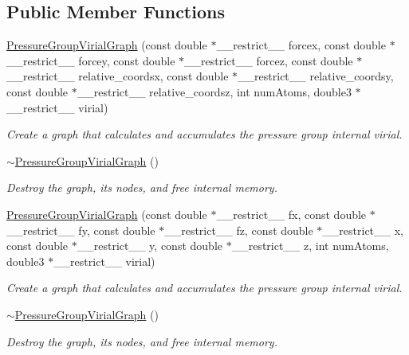 \subsection*{Public Member Functions}
\begin{DoxyCompactItemize}
\item 
\hyperlink{classPressureGroupVirialGraph_ae7ff1b34d814a6c977a50430167f4304}{Pressure\+Group\+Virial\+Graph} (const double $\ast$\+\_\+\+\_\+restrict\+\_\+\+\_\+ forcex, const double $\ast$\+\_\+\+\_\+restrict\+\_\+\+\_\+ forcey, const double $\ast$\+\_\+\+\_\+restrict\+\_\+\+\_\+ forcez, const double $\ast$\+\_\+\+\_\+restrict\+\_\+\+\_\+ relative\+\_\+coordsx, const double $\ast$\+\_\+\+\_\+restrict\+\_\+\+\_\+ relative\+\_\+coordsy, const double $\ast$\+\_\+\+\_\+restrict\+\_\+\+\_\+ relative\+\_\+coordsz, int num\+Atoms, double3 $\ast$\+\_\+\+\_\+restrict\+\_\+\+\_\+ virial)
\begin{DoxyCompactList}\small\item\em Create a graph that calculates and accumulates the pressure group internal virial. \end{DoxyCompactList}\item 
\hyperlink{classPressureGroupVirialGraph_a7f8e55580a547bf7e671cdb4fb590cd9}{$\sim$\+Pressure\+Group\+Virial\+Graph} ()
\begin{DoxyCompactList}\small\item\em Destroy the graph, its nodes, and free internal memory. \end{DoxyCompactList}\item 
\hyperlink{classPressureGroupVirialGraph_acc008fb3d4ecd0443509fb21c92ba592}{Pressure\+Group\+Virial\+Graph} (const double $\ast$\+\_\+\+\_\+restrict\+\_\+\+\_\+ fx, const double $\ast$\+\_\+\+\_\+restrict\+\_\+\+\_\+ fy, const double $\ast$\+\_\+\+\_\+restrict\+\_\+\+\_\+ fz, const double $\ast$\+\_\+\+\_\+restrict\+\_\+\+\_\+ x, const double $\ast$\+\_\+\+\_\+restrict\+\_\+\+\_\+ y, const double $\ast$\+\_\+\+\_\+restrict\+\_\+\+\_\+ z, int num\+Atoms, double3 $\ast$\+\_\+\+\_\+restrict\+\_\+\+\_\+ virial)
\begin{DoxyCompactList}\small\item\em Create a graph that calculates and accumulates the pressure group internal virial. \end{DoxyCompactList}\item 
\hyperlink{classPressureGroupVirialGraph_a7f8e55580a547bf7e671cdb4fb590cd9}{$\sim$\+Pressure\+Group\+Virial\+Graph} ()
\begin{DoxyCompactList}\small\item\em Destroy the graph, its nodes, and free internal memory. \end{DoxyCompactList}\end{DoxyCompactItemize}
